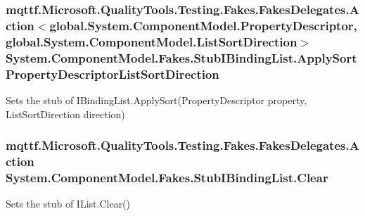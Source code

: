 \hypertarget{class_system_1_1_component_model_1_1_fakes_1_1_stub_i_binding_list_a49447b0aff1936542574e53a42399dc4}{
\subsubsection[{Apply\-Sort\-Property\-Descriptor\-List\-Sort\-Direction}]{\setlength{\rightskip}{0pt plus 5cm}mqttf.\-Microsoft.\-Quality\-Tools.\-Testing.\-Fakes.\-Fakes\-Delegates.\-Action$<$global.\-System.\-Component\-Model.\-Property\-Descriptor, global.\-System.\-Component\-Model.\-List\-Sort\-Direction$>$ System.\-Component\-Model.\-Fakes.\-Stub\-I\-Binding\-List.\-Apply\-Sort\-Property\-Descriptor\-List\-Sort\-Direction}}\label{class_system_1_1_component_model_1_1_fakes_1_1_stub_i_binding_list_a49447b0aff1936542574e53a42399dc4}


Sets the stub of I\-Binding\-List.\-Apply\-Sort(\-Property\-Descriptor property, List\-Sort\-Direction direction)

\hypertarget{class_system_1_1_component_model_1_1_fakes_1_1_stub_i_binding_list_a41cc7b94e4cd944f104f32f8b5014274}{
\subsubsection[{Clear}]{\setlength{\rightskip}{0pt plus 5cm}mqttf.\-Microsoft.\-Quality\-Tools.\-Testing.\-Fakes.\-Fakes\-Delegates.\-Action System.\-Component\-Model.\-Fakes.\-Stub\-I\-Binding\-List.\-Clear}}\label{class_system_1_1_component_model_1_1_fakes_1_1_stub_i_binding_list_a41cc7b94e4cd944f104f32f8b5014274}


Sets the stub of I\-List.\-Clear()

